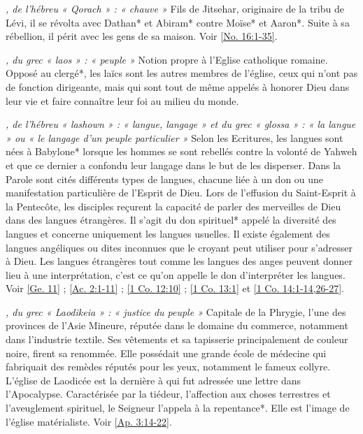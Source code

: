 \begin{multicols}{2}
\textit{, de l'hébreu « Qorach » : « chauve »}\newline
Fils de Jitsehar, originaire de la tribu de Lévi, il se révolta avec Dathan* et Abiram* contre Moïse* et Aaron*. Suite à sa rébellion, il périt avec les gens de sa maison. Voir \vref{No. 16:1-35}.

\textit{, du grec « laos » : « peuple »}\newline
Notion propre à l'Eglise catholique romaine. Opposé au clergé*, les laïcs sont les autres membres de l'église, ceux qui n'ont pas de fonction dirigeante, mais qui sont tout de même appelés à honorer Dieu dans leur vie et faire connaître leur foi au milieu du monde.

\textit{, de l'hébreu « lashown » : « langue, langage » et du grec « glossa » : « la langue » ou « le langage d'un peuple particulier »}\newline
Selon les Ecritures, les langues sont nées à Babylone* lorsque les hommes se sont rebellés contre la volonté de Yahweh et que ce dernier a confondu leur langage dans le but de les disperser. Dans la Parole sont cités différents types de langues, chacune liée à un don ou une manifestation particulière de l'Esprit de Dieu. Lors de l'effusion du Saint-Esprit à la Pentecôte, les disciples reçurent la capacité de parler des merveilles de Dieu dans des langues étrangères. Il s'agit du don spirituel* appelé la diversité des langues et concerne uniquement les langues usuelles. Il existe également des langues angéliques ou dites inconnues que le croyant peut utiliser pour s'adresser à Dieu. Les langues étrangères tout comme les langues des anges peuvent donner lieu à une interprétation, c'est ce qu'on appelle le don d'interpréter les langues. Voir \vref{Ge. 11} ; \vref{Ac. 2:1-11} ; \vref{1 Co. 12:10} ; \vref{1 Co. 13:1} et \vref{1 Co. 14:1-14,26-27}.

\textit{, du grec « Laodikeia » : « justice du peuple »}\newline
Capitale de la Phrygie, l'une des provinces de l'Asie Mineure, réputée dans le domaine du commerce, notamment dans l'industrie textile. Ses vêtements et sa tapisserie principalement de couleur noire, firent sa renommée. Elle possédait une grande école de médecine qui fabriquait des remèdes réputés pour les yeux, notamment le fameux collyre. L'église de Laodicée est la dernière à qui fut adressée une lettre dans l'Apocalypse. Caractérisée par la tiédeur, l'affection aux choses terrestres et l'aveuglement spirituel, le Seigneur l'appela à la repentance*. Elle est l'image de l'église matérialiste. Voir \vref{Ap. 3:14-22}.


\end{multicols}
